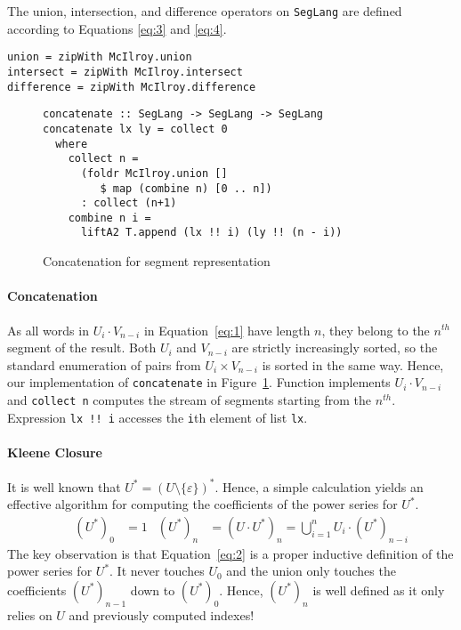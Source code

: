 The union, intersection, and difference operators on
\lstinline{SegLang} are defined according to Equations \eqref{eq:3} and
\eqref{eq:4}.
\begin{lstlisting}[numbers=none]
union = zipWith McIlroy.union
intersect = zipWith McIlroy.intersect
difference = zipWith McIlroy.difference
\end{lstlisting}

\begin{figure}[tp]
\begin{lstlisting}
concatenate :: SegLang -> SegLang -> SegLang
concatenate lx ly = collect 0
  where
    collect n =
      (foldr McIlroy.union []
         $ map (combine n) [0 .. n])
      : collect (n+1)
    combine n i =
      liftA2 T.append (lx !! i) (ly !! (n - i))
\end{lstlisting}
\vspace{-\baselineskip}
  \caption{Concatenation for segment representation}
  \label{fig:concatenate-with-segments}
\end{figure}

\paragraph{Concatenation}
As all
words in $U_i \cdot V_{n-i}$ in Equation~\eqref{eq:1} have length $n$, they belong to the
$n^{th}$ segment of the result. Both $U_i$ and
$V_{n-i}$ are strictly increasingly sorted, so the standard enumeration of pairs from
$U_i \times
V_{n-i}$ is sorted in the same way. Hence, our implementation of
\lstinline{concatenate} in Figure~\ref{fig:concatenate-with-segments}.  Function  implements $U_i
\cdot V_{n-i}$ and  \lstinline{collect n} computes the stream of segments starting from
the $n^{th}$. Expression \lstinline{lx !! i} accesses the \lstinline{i}th element of
list \lstinline{lx}.  


\paragraph{Kleene Closure}
It is well known that $U^* = (U\setminus\{\varepsilon\})^*$. 
Hence, a simple calculation yields an
effective algorithm for computing the coefficients of the power series for $U^*$. 
\begin{align}
  \label{eq:2}
  &%
  & (U^*)_0 &= 1
  & (U^*)_n &= (U \cdot U^*)_n = \bigcup_{i=1}^n U_i\cdot (U^*)_{n-i}
\end{align}
The key observation is that Equation~\eqref{eq:2} is a proper
inductive definition of the power series for $U^*$. It never touches $U_0$ and the union
only touches the coefficients $(U^*)_{n-1}$ down to $(U^*)_0$. Hence, $(U^*)_n$ is well
defined as it only relies on $U$ and previously computed indexes!

